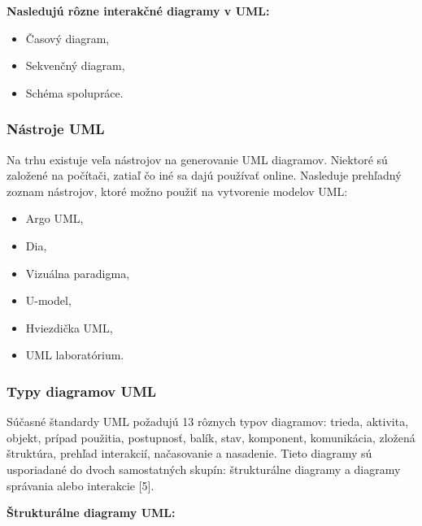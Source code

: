 \documentclass[a4paper]{feidippp}
\begin{document}
\textbf {Nasledujú rôzne interakčné diagramy v UML:}


\begin{itemize}
  \item Časový diagram,
  \item Sekvenčný diagram, 
  \item Schéma spolupráce.
  
\end{itemize}


\subsubsection{Nástroje UML}

Na trhu existuje veľa nástrojov na generovanie UML diagramov. Niektoré sú založené na počítači, zatiaľ čo iné sa dajú používať online. Nasleduje prehľadný zoznam nástrojov, ktoré možno použiť na vytvorenie modelov UML:


\begin{itemize}
  \item Argo UML,
  \item Dia, 
  \item Vizuálna paradigma,
  \item U-model,
  \item Hviezdička UML,
  \item 	UML laboratórium.
  
\end{itemize}

\subsubsection{Typy diagramov UML}

Súčasné štandardy UML požadujú 13 rôznych typov diagramov: trieda, aktivita, objekt, prípad použitia, postupnosť, balík, stav, komponent, komunikácia, zložená štruktúra, prehľad interakcií, načasovanie a nasadenie.
Tieto diagramy sú usporiadané do dvoch samostatných skupín: štrukturálne diagramy a diagramy správania alebo interakcie [5].

\textbf{Štrukturálne diagramy UML:}
\end{document}
